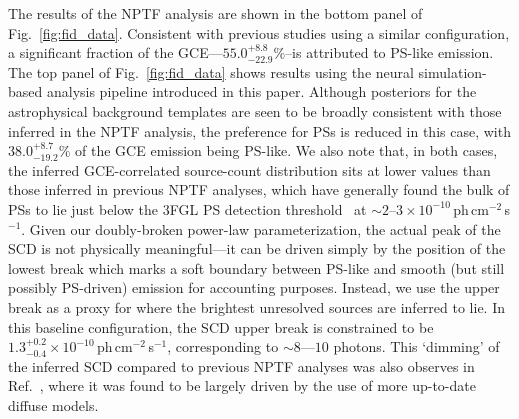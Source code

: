\documentclass[prd,aps,10pt,nofootinbib,twocolumn,superscriptaddress,preprintnumbers,balancelastpage,longbibliography,floatfix]{revtex4-2}
\begin{document}
The results of the NPTF analysis are shown in the bottom panel of Fig.~\ref{fig:fid_data}. Consistent with previous studies using a similar configuration, a significant fraction of the GCE---$55.0^{+8.8}_{-22.9}\%$--is attributed to PS-like emission.
The top panel of Fig.~\ref{fig:fid_data} shows results using the neural simulation-based analysis pipeline introduced in this paper. Although posteriors for the astrophysical background templates are seen to be broadly consistent with those inferred in the NPTF analysis, the preference for PSs is reduced in this case, with $38.0^{+8.7}_{-19.2}\%$ of the GCE emission being PS-like. We also note that, in both cases, the inferred GCE-correlated source-count distribution sits at lower values than those inferred in previous NPTF analyses, which have generally found the bulk of PSs to lie just below the 3FGL PS detection threshold~\cite{Lee:2015fea} at $\sim2$--$3\times 10^{-10}$\,ph\,cm$^{-2}$\,s$^{-1}$. Given our doubly-broken power-law parameterization, the actual peak of the SCD is not physically meaningful---it can be driven simply by the position of the lowest break which marks a soft boundary between PS-like and smooth (but still possibly PS-driven) emission for accounting purposes. Instead, we use the upper break as a proxy for where the brightest unresolved sources are inferred to lie. In this baseline configuration, the SCD upper break is constrained to be $1.3^{+0.2}_{-0.4}\times 10^{-10}$\,ph\,cm$^{-2}$\,s$^{-1}$, corresponding to $\sim8$---$10$ photons. This `dimming' of the inferred SCD compared to previous NPTF analyses was also observes in Ref.~\cite{List:2021aer}, where it was found to be largely driven by the use of more up-to-date diffuse models.
\end{document}
